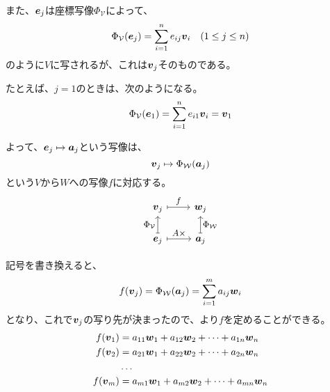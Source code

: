 \documentclass[../../../topic_linear-algebra]{subfiles}
\begin{document}
また、$\vb*{e}_j$は座標写像$\Phi_{\mathcal{V}}$によって、
\begin{equation*}
  \Phi_{\mathcal{V}}(\vb*{e}_j) = \sum_{i=1}^n e_{ij} \vb*{v}_i \quad (1 \leq j \leq n)
\end{equation*}
のように$V$に写されるが、これは$\vb*{v}_j$そのものである。

\br

\begin{handout}[補足：$\Phi_{\mathcal{V}}(\vb*{e}_j) = \vb*{v}_j$の確認]
  たとえば、$j=1$のときは、次のようになる。
  \begin{equation*}
    \Phi_{\mathcal{V}}(\vb*{e}_1) = \sum_{i=1}^n e_{i1} \vb*{v}_i = \vb*{v}_1
  \end{equation*}
\end{handout}

\br

よって、$\vb*{e}_j \mapsto \vb*{a}_j$という写像は、
\begin{equation*}
  \vb*{v}_j \mapsto \Phi_{\mathcal{W}}(\vb*{a}_j)
\end{equation*}
という$V$から$W$への写像$f$に対応する。
\begin{equation}
  \begin{tikzcd}[every label/.append style = {font = \small}]
    \vb*{v}_j \arrow[r,mapsto,"f"] & \vb*{w}_j \\
    \vb*{e}_j \arrow[u,mapsto,"{\Phi_{\mathcal{V}}}"] \arrow[r,mapsto,"A \times"] & \vb*{a}_j \arrow[u,mapsto,"{\Phi_{\mathcal{W}}}"']
  \end{tikzcd}
\end{equation}

\br

記号を書き換えると、
\begin{equation*}
  f(\vb*{v}_j) = \Phi_{\mathcal{W}}(\vb*{a}_j) = \sum_{i=1}^m a_{ij} \vb*{w}_i
\end{equation*}
となり、これで$\vb*{v}_j$の写り先が決まったので、より$f$を定めることができる。
\begin{align*}
  f(\vb*{v}_1) &= a_{11}\vb*{w}_1 + a_{12}\vb*{w}_2 + \cdots + a_{1n}\vb*{w}_n \\
  f(\vb*{v}_2) &= a_{21}\vb*{w}_1 + a_{22}\vb*{w}_2 + \cdots + a_{2n}\vb*{w}_n \\
  & \ldots \\
  f(\vb*{v}_m) &= a_{m1}\vb*{w}_1 + a_{m2}\vb*{w}_2 + \cdots + a_{mn}\vb*{w}_n
\end{align*}
\end{document}
